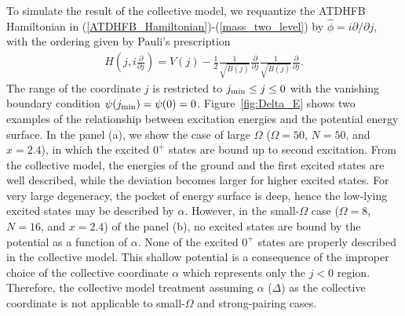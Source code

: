 \documentclass[11pt]{book} %
\begin{document}
To simulate the result of the collective model, we requantize the ATDHFB Hamiltonian in (\ref{ATDHFB_Hamiltonian})-(\ref{mass_two_level}) by $\hat{\phi}=i\partial/\partial j$, with
the ordering given by Pauli's prescription
\begin{align}
	H \left( j,i\frac{\partial}{\partial j} \right) 
= V(j) - \frac{1}{2}\frac{1}{\sqrt{B(j)}}\frac{\partial}{\partial j}\frac{1}{\sqrt{B(j)}}\frac{\partial}{\partial j}.
\end{align}
The range of the coordinate $j$ is restricted to $j_{\rm min}\leq j \leq 0$
with the vanishing boundary condition $\psi(j_{\rm min})=\psi(0)=0$.
Figure~\ref{fig:Delta_E} shows two examples of the relationship 
between excitation energies and the potential energy surface.
In the panel (a), we show the case of large $\Omega$
($\Omega=50$, $N=50$, and $x=2.4$),
in which
the excited $0^+$ states are bound up to second excitation.
From the collective model, the energies of the ground and the first excited states
are well described, while the deviation becomes larger for
higher excited states.
For very large degeneracy, the pocket of energy surface is deep, 
hence the low-lying excited states may be described by $\alpha$. 
However, in the small-$\Omega$ case ($\Omega=8$, $N=16$, and $x=2.4$)
of the panel (b), no excited states are bound by the potential
as a function of $\alpha$.
None of the excited $0^+$ states
are properly described in the collective model.
This shallow potential is a consequence of the improper
choice of the collective coordinate $\alpha$
which represents only the $j<0$ region.
Therefore, the collective model treatment assuming
$\alpha$ ($\Delta$) as the collective coordinate
is not applicable to small-$\Omega$ and strong-pairing cases.
\end{document}
